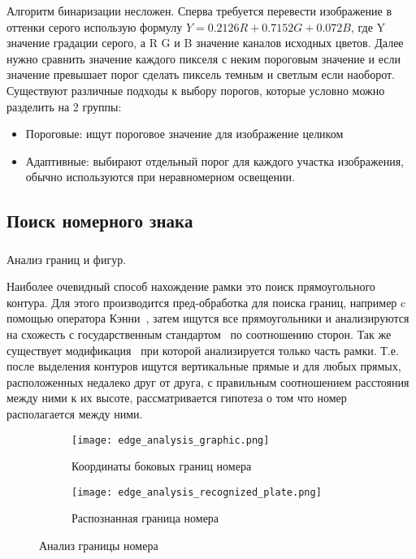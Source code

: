 Алгоритм бинаризации несложен. Сперва требуется перевести изображение в оттенки серого использую формулу $ Y = 0.2126R + 0.7152G + 0.072B $, где Y значение градации серого, а R G и B значение каналов исходных цветов. Далее нужно сравнить значение каждого пикселя с неким пороговым значение и если значение превышает порог сделать пиксель темным и светлым если наоборот. 
Существуют различные подходы к выбору порогов, которые условно можно разделить на 2 группы:
\begin{itemize}
  \item Пороговые: ищут пороговое значение для изображение целиком
  \item Адаптивные: выбирают отдельный порог для каждого участка изображения, обычно используются при неравномерном освещении.
\end{itemize}


\subsection{Поиск номерного знака}
\label{sub:domain:search}

\subsubsection{}
\label{sub:domain:search:edges_analisys}
Анализ границ и фигур.

Наиболее очевидный способ нахождение рамки это поиск прямоугольного контура. Для этого производится пред-обработка для поиска границ, например c помощью оператора Кэнни~\cite{canny_edge_detector}, затем ищутся все прямоугольники и анализируются на схожесть с государственным стандартом~\cite{stb_914_99} по соотношению сторон. Так же существует модификация~\cite{recognition_using_hought} при которой анализируется только часть рамки. Т.е. после выделения контуров ищутся вертикальные прямые и для любых прямых, расположенных недалеко друг от друга, с правильным соотношением расстояния между ними к их высоте, рассматривается гипотеза о том что номер располагается между ними. 


\begin{figure}[ht]
\centering
  \begin{subfigure}[b]{0.48\textwidth} 
    \centering
    \texttt{[image: edge\_analysis\_graphic.png]}  
    \caption{Координаты боковых границ номера}
  \end{subfigure}
  \begin{subfigure}[b]{0.48\textwidth} 
    \centering
    \texttt{[image: edge\_analysis\_recognized\_plate.png]}  
    \caption{Распознанная граница номера}
  \end{subfigure}
  \caption{Анализ границы номера}
  \label{fig:domain:search:edges_analisys:edge_graphic}
\end{figure}


